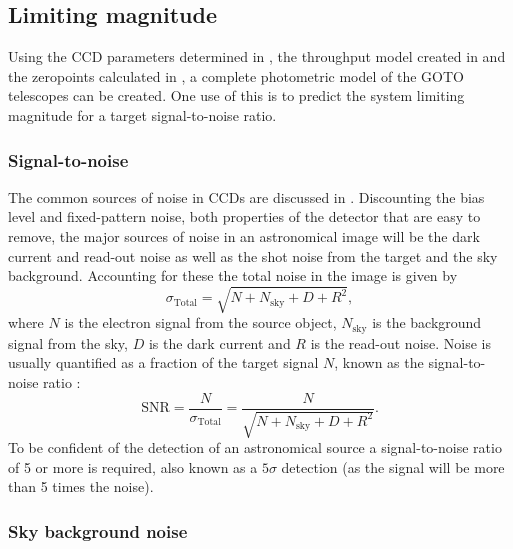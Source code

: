 \subsection{Limiting magnitude}
\label{sec:lim_mag}
\begin{colsection}

Using the CCD parameters determined in , the throughput model created in  and the zeropoints calculated in , a complete photometric model of the GOTO telescopes can be created. One use of this is to predict the system limiting magnitude for a target signal-to-noise ratio.

\subsubsection{Signal-to-noise}

The common sources of noise in CCDs are discussed in . Discounting the bias level and fixed-pattern noise, both properties of the detector that are easy to remove, the major sources of noise in an astronomical image will be the dark current and read-out noise as well as the shot noise from the target and the sky background. Accounting for these the total noise in the image is given by
%
\begin{equation}
    \sigma_\text{Total} = \sqrt{N + N_\text{sky} + D + R^2},
    \label{eq:total_noise}
\end{equation}
%
where $N$ is the electron signal from the source object, $N_\text{sky}$ is the background signal from the sky, $D$ is the dark current and $R$ is the read-out noise. Noise is usually quantified as a fraction of the target signal $N$, known as the signal-to-noise ratio :
%
\begin{equation}
    \text{SNR} = \frac{N}{\sigma_\text{Total}} = \frac{N}{\sqrt{N + N_\text{sky} + D + R^2}}.
    \label{eq:snr}
\end{equation}
%
To be confident of the detection of an astronomical source a signal-to-noise ratio of 5 or more is required, also known as a $5\sigma$ detection (as the signal will be more than 5 times the noise).

\newpage

\subsubsection{Sky background noise}


\end{colsection}
